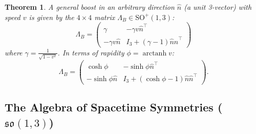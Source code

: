 \documentclass{amsart}
\newtheorem{theorem}{Theorem}[section]
\theoremstyle{definition}
\theoremstyle{remark}
\DeclareMathOperator{\arctanh}{arctanh}
\begin{document}
\begin{theorem}\label{thm:general_boost_so13}
  A general boost in an arbitrary direction $\hat{n}$ (a unit 3-vector) with speed $v$ is given by the $4 \times 4$ matrix $\Lambda_B \in \mathrm{SO}^+(1,3)$:
  \begin{equation*}
    \Lambda_B =
    \begin{pmatrix}
      \gamma & -\gamma v \hat{n}^\top \\
      -\gamma v \hat{n} & I_3 + \left(\gamma-1\right)\hat{n}\hat{n}^\top
    \end{pmatrix}
  \end{equation*}
  where $\gamma=\frac{1}{\sqrt{1-v^2}}$. In terms of rapidity $\phi=\arctanh v$:
  \begin{equation*}
    \Lambda_B =
    \begin{pmatrix}
      \cosh \phi & -\sinh \phi \hat{n}^\top \\
      -\sinh \phi \hat{n} & I_3 + (\cosh \phi - 1) \hat{n} \hat{n}^\top
    \end{pmatrix}.
  \end{equation*}
\end{theorem}

\subsection{The Algebra of Spacetime Symmetries ($\mathfrak{so}(1,3)$)}
\label{subsec:so13_algebra}
\end{document}
